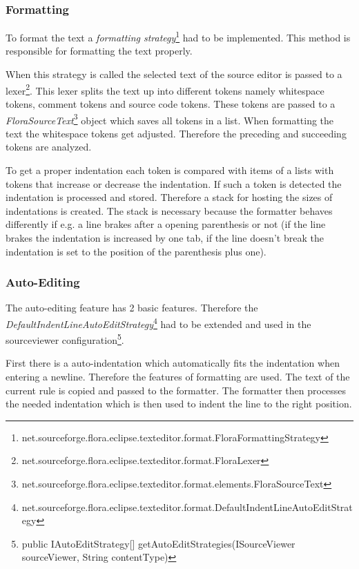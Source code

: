 \documentclass[a4paper,11pt]{article}
\begin{document}
\subsubsection{Formatting}
To format the text a \emph{formatting strategy}\footnote{
net.sourceforge.flora.eclipse.texteditor.format.FloraFormattingStrategy}
had to be implemented. This method is responsible for formatting the text
properly.

When this strategy is called the selected text of the source editor is passed
to a lexer\footnote{
net.sourceforge.flora.eclipse.texteditor.format.FloraLexer}.
This lexer splits the text up into different tokens namely whitespace tokens,
comment tokens and source code tokens. These tokens are passed to a
\emph{FloraSourceText}\footnote{
net.sourceforge.flora.eclipse.texteditor.format.elements.FloraSourceText}
object which saves all tokens in a list. When formatting the text the
whitespace tokens get adjusted. Therefore the preceding and succeeding
tokens are analyzed.

To get a proper indentation each token is compared with items of a lists
with tokens that increase or decrease the indentation. If such a token is
detected the indentation is processed and stored.
Therefore a stack for hosting the sizes of indentations is created.
The stack is necessary because the formatter behaves differently if e.g. a line brakes
after a opening parenthesis or not (if the line brakes the indentation is
increased by one tab, if the line doesn't break the indentation is set to the
position of the parenthesis plus one).


\subsubsection{Auto-Editing}
The auto-editing feature has 2 basic features.
Therefore the \emph{DefaultIndentLineAutoEditStrategy}\footnote{
net.sourceforge.flora.eclipse.texteditor.format.DefaultIndentLineAutoEditStrategy}
had to be extended and used in the sourceviewer configuration\footnote{
public IAutoEditStrategy[] getAutoEditStrategies(ISourceViewer sourceViewer, String contentType)}.

First there is a auto-indentation which automatically fits the indentation when
entering a newline. Therefore the features of formatting are used. The text of the
current rule is copied and passed to the formatter. The formatter then processes the
needed indentation which is then used to indent the line to the right position.
\end{document}
